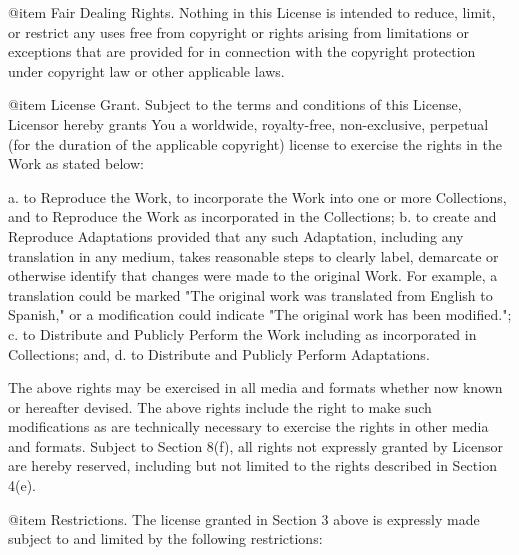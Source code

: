 @item
Fair Dealing Rights. Nothing in this License is intended to reduce,
limit, or restrict any uses free from copyright or rights arising from
limitations or exceptions that are provided for in connection with the
copyright protection under copyright law or other applicable laws.

@item
License Grant. Subject to the terms and conditions of this License,
Licensor hereby grants You a worldwide, royalty-free, non-exclusive,
perpetual (for the duration of the applicable copyright) license to
exercise the rights in the Work as stated below:

 a. to Reproduce the Work, to incorporate the Work into one or more
    Collections, and to Reproduce the Work as incorporated in the
    Collections;
 b. to create and Reproduce Adaptations provided that any such Adaptation,
    including any translation in any medium, takes reasonable steps to
    clearly label, demarcate or otherwise identify that changes were made
    to the original Work. For example, a translation could be marked "The
    original work was translated from English to Spanish," or a
    modification could indicate "The original work has been modified.";
 c. to Distribute and Publicly Perform the Work including as incorporated
    in Collections; and,
 d. to Distribute and Publicly Perform Adaptations.

The above rights may be exercised in all media and formats whether now
known or hereafter devised. The above rights include the right to make
such modifications as are technically necessary to exercise the rights in
other media and formats. Subject to Section 8(f), all rights not expressly
granted by Licensor are hereby reserved, including but not limited to the
rights described in Section 4(e).

@item
Restrictions. The license granted in Section 3 above is expressly made
subject to and limited by the following restrictions:

